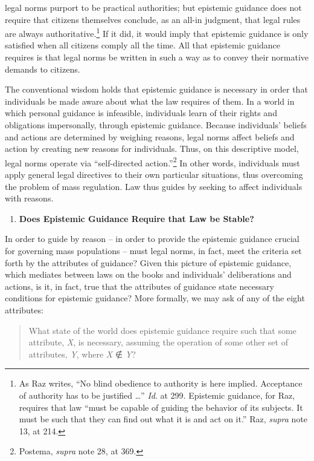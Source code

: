 legal norms purport to be practical authorities; but epistemic guidance
does not require that citizens themselves conclude, as an all-in
judgment, that legal rules are always authoritative.\footnote{As Raz
  writes, ``No blind obedience to authority is here implied. Acceptance
  of authority has to be justified \ldots{}'' \emph{Id}. at 299.
  Epistemic guidance, for Raz, requires that law ``must be capable of
  guiding the behavior of its subjects. It must be such that they can
  find out what it is and act on it.'' Raz, \emph{supra} note 13, at
  214.} If it did, it would imply that epistemic guidance is only
satisfied when all citizens comply all the time. All that epistemic
guidance requires is that legal norms be written in such a way as to
convey their normative demands to citizens.

The conventional wisdom holds that epistemic guidance is necessary in
order that individuals be made aware about what the law requires of
them. In a world in which personal guidance is infeasible, individuals
learn of their rights and obligations impersonally, through epistemic
guidance. Because individuals' beliefs and actions are determined by
weighing reasons, legal norms affect beliefs and action by creating new
reasons for individuals. Thus, on this descriptive model, legal norms
operate via ``self-directed action.''\footnote{Postema, \emph{supra}
  note 28, at 369.} In other words, individuals must apply general legal
directives to their own particular situations, thus overcoming the
problem of mass regulation. Law thus guides by seeking to affect
individuals with reasons.

\begin{enumerate}
\def\labelenumi{\arabic{enumi}.}
\item
  \textbf{Does Epistemic Guidance Require that Law be Stable?}
\end{enumerate}

In order to guide by reason -- in order to provide the epistemic
guidance crucial for governing mass populations -- must legal norms, in
fact, meet the criteria set forth by the attributes of guidance? Given
this picture of epistemic guidance, which mediates between laws on the
books and individuals' deliberations and actions, is it, in fact, true
that the attributes of guidance state necessary conditions for epistemic
guidance? More formally, we may ask of any of the eight attributes:

\begin{quote}
What state of the world does epistemic guidance require such that some
attribute, \emph{X}, is necessary, assuming the operation of some other
set of attributes, \emph{Y}, where \emph{X} ∉ \emph{Y}?
\end{quote}

